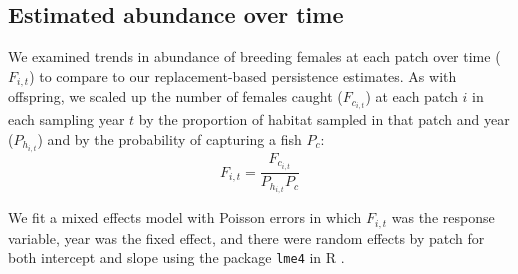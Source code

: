\documentclass[12pt, oneside]{article}   	%
\begin{document}


\subsection*{Estimated abundance over time} %

We examined trends in abundance of breeding females at each patch over time ($F_{i,t}$) to compare to our replacement-based persistence estimates. As with offspring, we scaled up the number of females caught ($F_{c_{i,t}}$) at each patch $i$ in each sampling year $t$ by the proportion of habitat sampled in that patch and year ($P_{h_{i,t}}$) and by the probability of capturing a fish $P_c$:
\begin{equation}
F_{i,t} = \frac{F_{c_{i,t}}}{P_{h_{i,t}}P_c}
\end{equation}

We fit a mixed effects model with Poisson errors in which $F_{i,t}$ was the response variable, year was the fixed effect, and there were random effects by patch for both intercept and slope using the package \texttt{lme4} in R \citep{lme42015package}.
\end{document}
